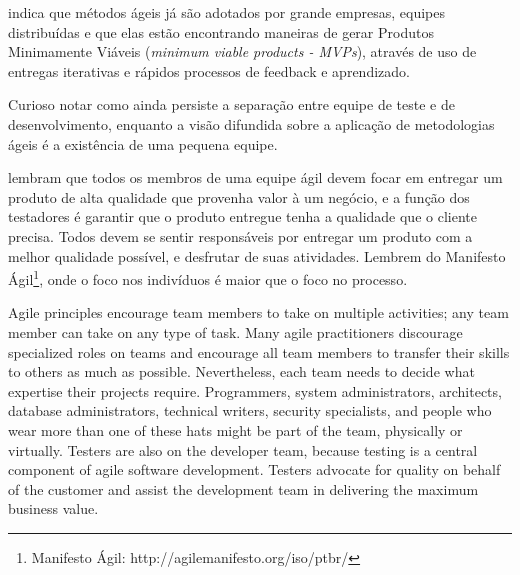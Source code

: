 \documentclass[
	12pt,				%
	openright,			%
	oneside,			%
	a4paper,			%
	english,			%
	brazil,				%
	]{abntex2}
\begin{document}
 indica que métodos ágeis já são adotados por grande empresas, equipes distribuídas e que elas estão encontrando maneiras de gerar Produtos Minimamente Viáveis (\emph{minimum viable products - MVPs}), através de uso de entregas iterativas e rápidos processos de feedback e aprendizado.


Curioso notar como ainda persiste a separação entre equipe de teste e de desenvolvimento, enquanto a visão difundida sobre a aplicação de metodologias ágeis é a existência de uma pequena equipe.

 lembram que todos os membros de uma equipe ágil devem focar em entregar um produto de alta qualidade que provenha valor à um negócio, e a função dos testadores é garantir que o produto entregue tenha a qualidade que o cliente precisa. Todos devem se sentir responsáveis por entregar um produto com a melhor qualidade possível, e desfrutar de suas atividades. Lembrem do Manifesto Ágil\footnote{Manifesto Ágil: http://agilemanifesto.org/iso/ptbr/}, onde o foco nos indivíduos é maior que o foco no processo.%

Agile principles encourage team members to take on multiple activities; any team member can take on any type of task. Many agile practitioners discourage specialized roles on teams and encourage all team members to transfer their skills to others as much as possible. Nevertheless, each team needs to decide what expertise their projects require. Programmers, system administrators, architects, database administrators, technical writers, security specialists, and people who wear more than one of these hats might be part of the team, physically or virtually. Testers are also on the developer team, because testing is a central component of agile software development. Testers advocate for quality on behalf of the customer and assist the development team in delivering the maximum business value.
\end{document}
